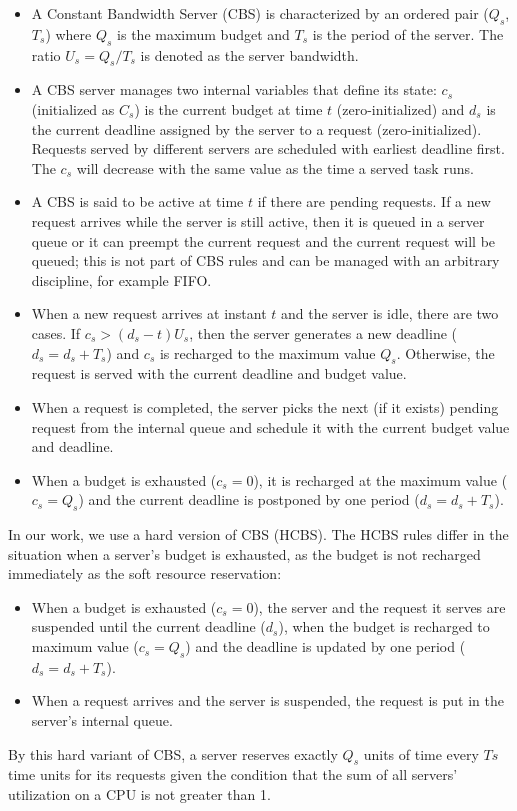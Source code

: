 \begin{itemize}
\item A Constant Bandwidth Server (CBS) is characterized by an ordered pair
($Q_{s}$, $T_{s}$) where $Q_{s}$ is the maximum budget and $T_{s}$ is the
period of the server. The ratio $U_{s} = Q_{s}/T_{s}$ is denoted as the
server bandwidth. 
\item A CBS server manages two internal variables that define its state:
$c_{s}$ (initialized as $C_{s}$) is the current budget at time $t$ 
(zero-initialized) and $d_{s}$ is the current deadline assigned by the 
server to a request (zero-initialized). Requests served by different 
servers are scheduled with earliest deadline first. The $c_{s}$ will
decrease with the same value as the time a served task runs. 
\item A CBS is said to be active at time $t$ if there are pending 
requests. If a new request arrives while the server is still active,
then it is queued in a server queue or it can preempt the current 
request and the current request will be queued; this is not part of 
CBS rules and can be managed with an arbitrary discipline, 
for example FIFO. 
\item When a new request arrives at instant $t$ and the server is idle, 
there are two cases. If $c_{s} > (d_{s} - t)U_{s}$, then the server 
generates a new deadline ($d_{s} = d_{s} + T_{s}$) and $c_{s}$ is 
recharged to the maximum value $Q_{s}$. Otherwise, the request is 
served with the current deadline and budget value.
\item When a request is completed, the server picks the next (if it exists)
pending request from the internal queue and schedule it with the current
budget value and deadline.
\item When a budget is exhausted ($c_{s} = 0$), it is recharged at the
maximum value ($c_{s} = Q_{s}$) and the current deadline is postponed by
one period ($d_{s} = d_{s} + T_{s}$).
\end{itemize}
In our work, we use a hard version of CBS (HCBS). The HCBS rules differ 
in the situation when a server's budget is exhausted, as the budget is not 
recharged immediately as the soft resource reservation:
\begin{itemize}
\item When a budget is exhausted ($c_{s} = 0$), the server and the request
it serves are suspended until the current deadline ($d_{s}$), when the 
budget is recharged to maximum value ($c_{s} = Q_{s}$) and the deadline 
is updated by one period ($d_{s} = d_{s} + T_{s}$).
\item When a request arrives and the server is suspended, the request is
put in the server's internal queue.
\end{itemize}
By this hard variant of CBS, a server reserves exactly $Q_{s}$ units
of time every $T{s}$ time units for its requests given the condition
that the sum of all servers' utilization on a CPU is not greater than 
1.

